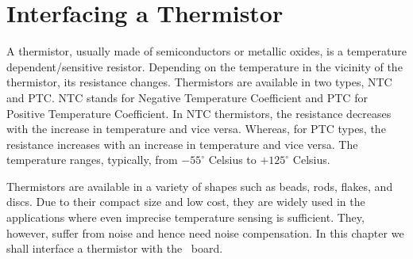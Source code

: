 \chapter {Interfacing a Thermistor}
\thispagestyle{empty}
\label{thermistor}

\newcommand{\LocTHERMfig}{\Origin/user-code/thermistor/figures}
\newcommand{\LocTHERMscicode}{\Origin/user-code/thermistor/scilab}
\newcommand{\LocTHERMscibrief}[1]{{\tt \seqsplit{%
Origin/user-code/thermistor/scilab/#1}}, see \fnrefp{fn:file-loc}}
\newcommand{\LocTHERMardcode}{\Origin/user-code/thermistor/arduino}
\newcommand{\LocTHERMardbrief}[1]{{\tt \seqsplit{%
Origin/user-code/thermistor/arduino/#1}}, see \fnrefp{fn:file-loc}}

\newcommand{\LocTHERMpycode}{\Origin/user-code/thermistor/python}
\newcommand{\LocTHERMpybrief}[1]{{\tt \seqsplit{%
Origin/user-code/thermistor/python/#1}}, see \fnrefp{fn:file-loc}}

\newcommand{\LocTHERMjuliacode}{\Origin/user-code/thermistor/julia}
\newcommand{\LocTHERMjuliabrief}[1]{{\tt \seqsplit{%
    Origin/user-code/thermistor/julia/#1}}, see \fnrefp{fn:file-loc}}

\newcommand{\LocTHERMOpenModelicacode}{\Origin/user-code/thermistor/OpenModelica}
\newcommand{\LocTHERMOpenModelicabrief}[1]{{\tt \seqsplit{%
    Origin/user-code/thermistor/OpenModelica/#1}}, see \fnrefp{fn:file-loc}}

A thermistor, usually made of semiconductors or metallic oxides, is a
temperature dependent/sensitive resistor. Depending on the temperature
in the vicinity of the thermistor, its resistance changes. Thermistors
are available in two types, NTC and PTC. NTC stands for Negative
Temperature Coefficient and PTC for Positive Temperature
Coefficient. In NTC thermistors, the resistance decreases with the
increase in temperature and vice versa. Whereas, for PTC types, the
resistance increases with an increase in temperature and vice
versa. The temperature ranges, typically, from $-55^{\circ}$ Celsius
to $+125^{\circ}$ Celsius.  

Thermistors are available in a variety of shapes such as beads, rods,
flakes, and discs. Due to their compact size and low cost, they are
widely used in the applications where even imprecise temperature
sensing is sufficient. They, however, suffer from noise and hence need
noise compensation. In this chapter we shall interface a thermistor
with the \arduino\ board.

